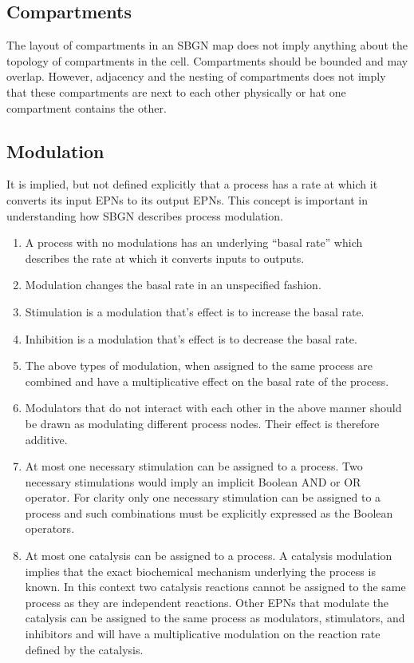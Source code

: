 \subsection{Compartments}

The layout of compartments in an SBGN map does not imply anything
about the topology of compartments in the cell. Compartments should be
bounded and may overlap. However, adjacency and the nesting of
compartments does not imply that these compartments are next to each
other physically or hat one compartment contains the other.

\subsection{Modulation}

It is implied, but not defined explicitly that a process has a rate at
which it converts its input EPNs to its output EPNs. This concept is
important in understanding how SBGN describes process modulation.

\begin{enumerate}
\item A process with no modulations has an underlying ``basal rate''
  which describes the rate at which it converts inputs to outputs.
\item Modulation changes the basal rate in an unspecified fashion.
\item Stimulation is a modulation that's effect is to increase the basal rate.
\item Inhibition is a modulation that's effect is to decrease the basal rate.
\item The above types of modulation, when assigned to the same process are combined and have a multiplicative effect on the basal rate of the process.
\item Modulators that do not interact with each other in the above manner should be drawn as modulating different process nodes. Their effect is therefore additive.
\item At most one necessary stimulation can be assigned to a process. Two necessary stimulations
  would imply an implicit Boolean AND or OR operator. For clarity only
  one necessary stimulation can be assigned to a process and such combinations must be
  explicitly expressed as the Boolean operators.
\item At most one catalysis can be assigned to a process. A catalysis
  modulation implies that the exact biochemical mechanism underlying
  the process is known. In this context two catalysis reactions cannot
  be assigned to the same process as they are
  independent reactions. Other EPNs that modulate the catalysis can be
  assigned to the same process as modulators, stimulators, and
  inhibitors and will have a multiplicative modulation on the reaction
  rate defined by the catalysis.
\end{enumerate}

